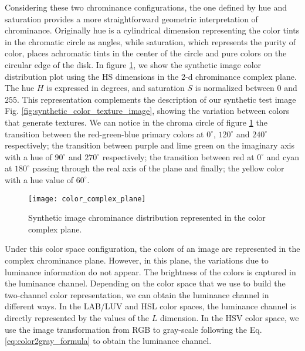 Considering these two chrominance configurations, the one defined by hue and saturation provides a more straightforward geometric interpretation of chrominance. Originally hue is a cylindrical dimension representing the color tints in the chromatic circle as angles, while saturation, which represents the purity of color, places achromatic tints in the center of the circle and pure colors on the circular edge of the disk. In figure \ref{fig:color_complex_plane}, we show the synthetic image color distribution plot using the HS dimensions in the 2-d chrominance complex plane. The hue $H$ is expressed in degrees, and saturation $S$ is normalized between $0$ and $255$. This representation complements the description of our synthetic test image Fig. \ref{fig:synthetic_color_texture_image}, showing the variation between colors that generate textures. We can notice in the chroma circle of figure \ref{fig:color_complex_plane} the transition between the red-green-blue primary colors at $0^\circ$, $120^\circ$ and $240^\circ$ respectively; the transition between purple and lime green on the imaginary axis with a hue of $90^\circ$ and $270^\circ$ respectively; the transition between red at $0^\circ$ and cyan at $180^\circ$ passing through the real axis of the plane and finally; the yellow color with a hue value of $60^\circ$.

\begin{figure}[!ht]
	\centering
    \texttt{[image: color\_complex\_plane]}
	\caption{Synthetic image chrominance distribution represented in the color complex plane.}\label{fig:color_complex_plane}
\end{figure}

Under this color space configuration, the colors of an image are represented in the complex chrominance plane. However, in this plane, the variations due to luminance information do not appear. The brightness of the colors is captured in the luminance channel. Depending on the color space that we use to build the two-channel color representation, we can obtain the luminance channel in different ways. In the LAB/LUV and HSL color spaces, the luminance channel is directly represented by the values of the $L$ dimension. In the HSV color space, we use the image transformation from RGB to gray-scale following the Eq. \eqref{eq:color2gray_formula} to obtain the luminance channel.

